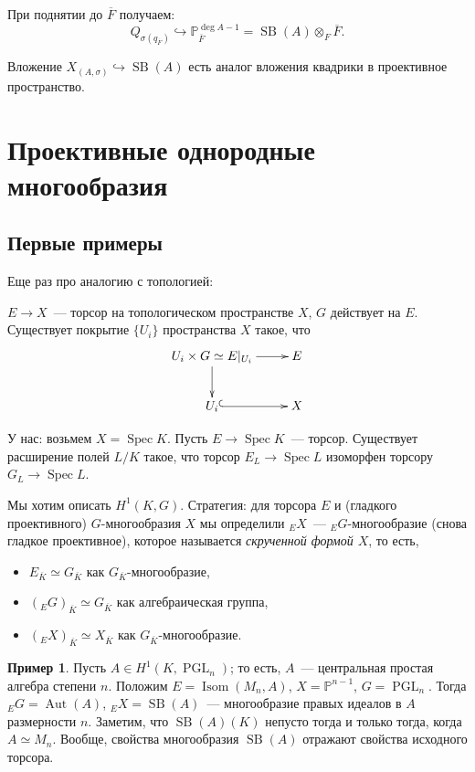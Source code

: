 \documentclass[a4paper]{article}
\DeclareMathOperator{\Spec}{Spec}
\DeclareMathOperator{\Aut}{Aut}
\DeclareMathOperator{\PGL}{PGL}
\DeclareMathOperator{\SB}{SB}
\DeclareMathOperator{\Isom}{Isom}
\newcommand{\isom}{\simeq}
\theoremstyle{definition}
\newtheorem{example}[theorem]{Пример}
\begin{document}
При поднятии до $\overline{F}$ получаем:
\[ Q_{\sigma (q_{\overline{F}})} \hookrightarrow \mathbb{P}^{\deg A -
  1}_{\overline{F}} = \SB (A) \otimes_F \overline{F}. \]

Вложение $X_{(A,\sigma)} \hookrightarrow \SB(A)$ есть аналог вложения
квадрики в проективное пространство.


\section{Проективные однородные многообразия}

\subsection{Первые примеры}

Еще раз про аналогию с топологией:

$E\to X$~--- торсор на топологическом пространстве $X$, $G$ действует
на $E$. Существует покрытие $\{U_i\}$ пространства $X$ такое, что
\[\begin{xymatrix}{U_i\times G\isom E|_{U_i}\ar[r]\ar[d] & E \\
U_i\ar@{^(->}[r] & X}\end{xymatrix}\]

У нас: возьмем $X=\Spec K$. Пусть $E\to\Spec K$~--- торсор. Существует
расширение полей $L/K$ такое, что торсор $E_L\to\Spec L$ изоморфен
торсору $G_L\to\Spec L$.

Мы хотим описать $H^1(K,G)$. Стратегия: для торсора $E$ и (гладкого
проективного) $G$-многообразия $X$ мы определили ${}_EX$~---
${}_EG$-многообразие (снова гладкое проективное), которое называется
\emph{скрученной формой $X$},  то есть,
\begin{itemize}
\item $E_{\overline{K}}\isom
G_{\overline{K}}$ как $G_{\overline{K}}$-многообразие,
\item $({}_EG)_{\overline{K}}\isom G_{\overline{K}}$ как алгебраическая
группа,
\item $({}_EX)_{\overline{K}}\isom X_{\overline{K}}$ как
  $G_{\overline{K}}$-многообразие.
\end{itemize}

\begin{example}
Пусть $A\in H^1(K,\PGL_n)$; то есть, $A$~--- центральная простая
алгебра степени $n$. Положим $E=\Isom(M_n,A)$, $X=\mathbb P^{n-1}$,
$G=\PGL_n$. Тогда ${}_EG=\Aut(A)$, ${}_EX=\SB(A)$~--- многообразие
правых идеалов в $A$ размерности $n$. Заметим, что $\SB(A)(K)$ непусто
тогда и только тогда, когда $A\isom M_n$. Вообще, свойства многообразия
$\SB(A)$ отражают свойства исходного торсора.
\end{example}
\end{document}
